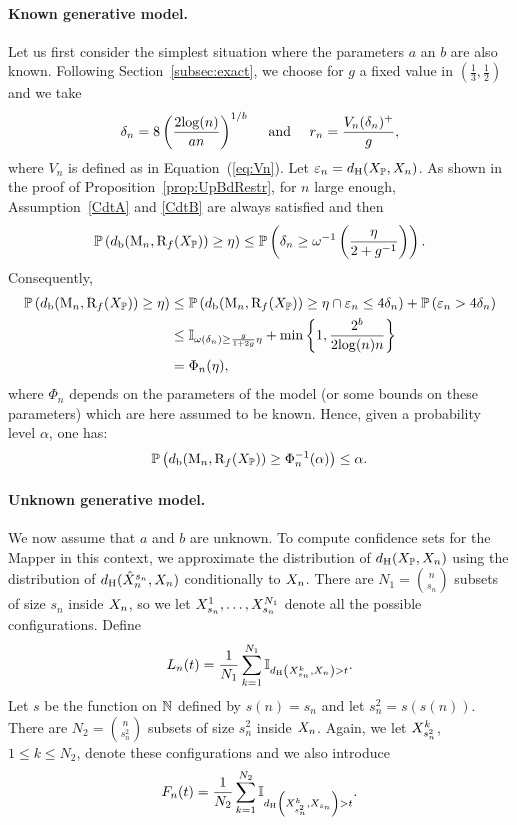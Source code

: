 \paragraph*{Known generative model.}  Let us first consider the simplest situation where  
the parameters $a$ an $b$ are also known. Following Section~\ref{subsec:exact}, we choose for $g$ a fixed value in $\left(\frac13,\frac 12\right)$ and we take 
$$\delta_n=8\left(\frac{2{\log}(n)}{an}\right)^{1/b}
\quad 
\textrm{ and }
\quad 
r_n=  \frac{V_n(\delta_n)^+} {g} ,$$
where $V_n$ is defined as in Equation~(\ref{eq:Vn}).
Let $\varepsilon_n=d_{\rm H}(X_{\mathbb{P}},X_n)$.
As shown in the proof of Proposition~\ref{prop:UpBdRestr}, for $n$ large enough, 
Assumption~\eqref{CdtA} and \eqref{CdtB} %
are always satisfied and then 
$$ \mathbb{P}\left(d_{\rm b}(\mathrm{M}_n,\mathrm{R}_f(X_{\mathbb{P}}))\geq\eta\right)  \leq  \mathbb{P}\left( \delta_n \geq  \omega^{-1}\left(\frac{\eta}{2+g^{-1}}\right) \right) .$$
Consequently,
\begin{align}
\mathbb{P}\left(d_{\rm b}(\mathrm{M}_n,\mathrm{R}_f(X_{\mathbb{P}}))\geq\eta\right) &\leq \mathbb{P}\left(d_{\rm b}(\mathrm{M}_n,\mathrm{R}_f(X_{\mathbb{P}}))\geq\eta \cap \varepsilon_n \leq 4\delta_n\right) + \mathbb{P}\left(\varepsilon_n > 4\delta_n\right)\nonumber \\
&\leq \mathbb{I}_{\omega(\delta_n)\geq \frac{g}{1+2g}\eta} +  \min\left\{1,\frac{2^b}{2{\log}(n)n}\right\} \nonumber \\
& = \Phi_n(\eta), \nonumber
\end{align}
where $ \Phi_n$ depends on the parameters of the model (or some bounds on these parameters)  which are here assumed to be known. 
Hence, given a probability level $\alpha$, one has:
$$\mathbb{P}\left(d_{\rm b}(\mathrm{M}_n,\mathrm{R}_f(X_{\mathbb{P}}))\geq\Phi_n^{-1}(\alpha)\right) \leq \alpha.$$


\paragraph*{Unknown generative model.} We now assume that $a$ and $b$ are unknown.  
To compute confidence sets for the Mapper in this context, we approximate the distribution of 
$d_{\rm H}(X_{\mathbb{P}},  X_n )$ using the distribution of  $d_{\rm H} (\hat {X}_n^{s_n}, X_n)$ conditionally to $X_n$.  
There are $N_1=\binom{n}{s_n}$ subsets of size $s_n$ inside $X_n$, so we let $X^1 _{s_n}, \dots ,  X^{N_1}_{s_n}$
denote all the possible configurations. Define
$$L_n(t)=\frac{1}{N_1}\sum_{k=1}^{N_1} \mathbb{I}_{d_{\rm H}\left(X^k_{s_n}, X_n \right) > t}.$$ 
Let $s$ be the function on $\mathbb{N}$ defined by $s(n) = s_n$ and let $s^2_n =s (s(n)).$  
There are $N_2=\binom{n}{s^2_n}$ subsets of size $s^2_n$ inside $X_n$. Again, we let $X^k_{s^2_n}$, $1\leq k \leq N_2$, 
denote these configurations and we also introduce 
$$F_n(t)=\frac{1}{N_2}\sum_{k=1}^{N_2} \mathbb{I}_{d_{\rm H}\left(X^k_{s^2_n} , X_{s_n}\right) > t}.$$

